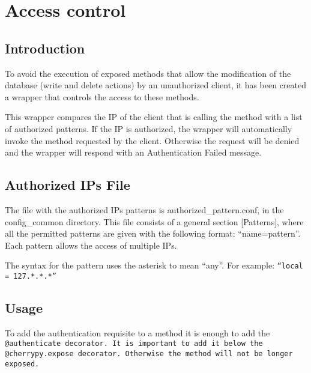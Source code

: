 \section{Access control}
\label{sec:Access_control}
\subsection{Introduction}
To avoid the execution of exposed methods that allow the modification of the database (write and delete actions) by an unauthorized 
client, it has been created a wrapper that controls the access to these methods.

This wrapper compares the IP of the client that is calling the method with a list of authorized patterns. If the IP is authorized, 
the wrapper will automatically invoke the method requested by the client. Otherwise the request will be denied and the wrapper will 
respond with an Authentication Failed message.


\subsection{Authorized IPs File}
The file with the authorized IPs patterns is authorized\_pattern.conf, in the config\_common directory. This file consists
of a general section [Patterns], where all the permitted patterns are given with the following format: ``name=pattern''. Each pattern
allows the access of multiple IPs. 

The syntax for the pattern uses the asterisk to mean ``any''. For example: \tt{``local = 127.*.*.*''}

\subsection{Usage}
To add the authentication requisite to a method it is enough to add the \tt{@authenticate} decorator. It is important to add it 
below the \tt{@cherrypy.expose} decorator. Otherwise the method will not be longer exposed.
